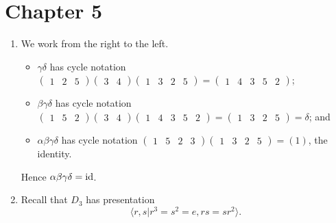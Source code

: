 \section*{Chapter 5}
\begin{enumerate}
    \item We work from the right to the left.
    \begin{itemize}
        \item $\gamma \delta$ has cycle notation $\begin{pmatrix}1 & 2 & 5\end{pmatrix}\begin{pmatrix}3 & 4\end{pmatrix}\begin{pmatrix}1 & 3 & 2 & 5\end{pmatrix} = \begin{pmatrix}1 & 4 & 3 & 5 & 2\end{pmatrix}$;
        \item $\beta \gamma \delta$ has cycle notation $\begin{pmatrix}1 & 5 & 2\end{pmatrix}\begin{pmatrix}3 & 4\end{pmatrix}\begin{pmatrix}1 & 4 & 3 & 5 & 2\end{pmatrix} = \begin{pmatrix}1 & 3 & 2 & 5\end{pmatrix} = \delta$; and
        \item $\alpha \beta \gamma \delta$ has cycle notation $\begin{pmatrix}1 & 5 & 2 & 3\end{pmatrix}\begin{pmatrix}1 & 3 & 2 & 5\end{pmatrix} = (1)$, the identity.
    \end{itemize}
    Hence $\alpha \beta \gamma \delta = \mathrm{id}$.

    \item Recall that $D_3$ has presentation
    \[
        \langle r, s \vert r^3 = s^2 = e, rs = sr^2 \rangle.
    \]


\end{enumerate}
